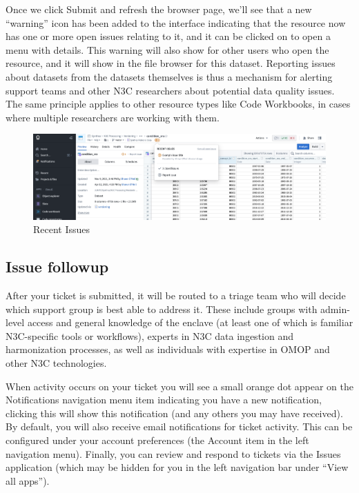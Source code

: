 \documentclass[
  letterpaper,
  DIV=11,
  numbers=noendperiod]{scrreprt}
\begin{document}
Once we click Submit and refresh the browser page, we'll see that a new
``warning'' icon has been added to the interface indicating that the
resource now has one or more open issues relating to it, and it can be
clicked on to open a menu with details. This warning will also show for
other users who open the resource, and it will show in the file browser
for this dataset. Reporting issues about datasets from the datasets
themselves is thus a mechanism for alerting support teams and other N3C
researchers about potential data quality issues. The same principle
applies to other resource types like Code Workbooks, in cases where
multiple researchers are working with them.

\begin{figure}

{\centering \includegraphics{chapters/images/support/image-08-issue-recent.png}

}

\caption{\label{fig-support-issue-recent}Recent Issues}

\end{figure}

\hypertarget{sec-support-internal-followup}{%
\subsection{Issue followup}\label{sec-support-internal-followup}}

After your ticket is submitted, it will be routed to a triage team who
will decide which support group is best able to address it. These
include groups with admin-level access and general knowledge of the
enclave (at least one of which is familiar N3C-specific tools or
workflows), experts in N3C data ingestion and harmonization processes,
as well as individuals with expertise in OMOP and other N3C
technologies.

When activity occurs on your ticket you will see a small orange dot
appear on the Notifications navigation menu item indicating you have a
new notification, clicking this will show this notification (and any
others you may have received). By default, you will also receive email
notifications for ticket activity. This can be configured under your
account preferences (the Account item in the left navigation menu).
Finally, you can review and respond to tickets via the Issues
application (which may be hidden for you in the left navigation bar
under ``View all apps'').
\end{document}

